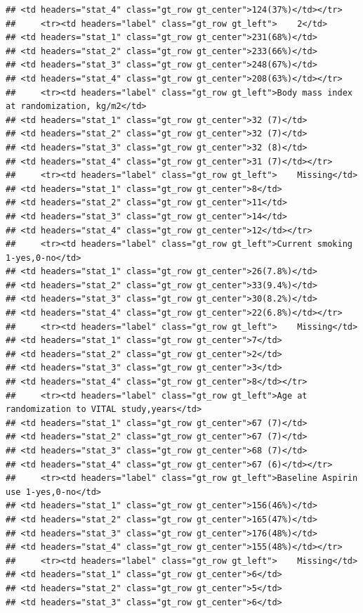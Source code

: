 \documentclass{article}
\begin{document}
\begin{verbatim}
## <td headers="stat_4" class="gt_row gt_center">124(37%)</td></tr>
##     <tr><td headers="label" class="gt_row gt_left">    2</td>
## <td headers="stat_1" class="gt_row gt_center">231(68%)</td>
## <td headers="stat_2" class="gt_row gt_center">233(66%)</td>
## <td headers="stat_3" class="gt_row gt_center">248(67%)</td>
## <td headers="stat_4" class="gt_row gt_center">208(63%)</td></tr>
##     <tr><td headers="label" class="gt_row gt_left">Body mass index at randomization, kg/m2</td>
## <td headers="stat_1" class="gt_row gt_center">32 (7)</td>
## <td headers="stat_2" class="gt_row gt_center">32 (7)</td>
## <td headers="stat_3" class="gt_row gt_center">32 (8)</td>
## <td headers="stat_4" class="gt_row gt_center">31 (7)</td></tr>
##     <tr><td headers="label" class="gt_row gt_left">    Missing</td>
## <td headers="stat_1" class="gt_row gt_center">8</td>
## <td headers="stat_2" class="gt_row gt_center">11</td>
## <td headers="stat_3" class="gt_row gt_center">14</td>
## <td headers="stat_4" class="gt_row gt_center">12</td></tr>
##     <tr><td headers="label" class="gt_row gt_left">Current smoking 1-yes,0-no</td>
## <td headers="stat_1" class="gt_row gt_center">26(7.8%)</td>
## <td headers="stat_2" class="gt_row gt_center">33(9.4%)</td>
## <td headers="stat_3" class="gt_row gt_center">30(8.2%)</td>
## <td headers="stat_4" class="gt_row gt_center">22(6.8%)</td></tr>
##     <tr><td headers="label" class="gt_row gt_left">    Missing</td>
## <td headers="stat_1" class="gt_row gt_center">7</td>
## <td headers="stat_2" class="gt_row gt_center">2</td>
## <td headers="stat_3" class="gt_row gt_center">3</td>
## <td headers="stat_4" class="gt_row gt_center">8</td></tr>
##     <tr><td headers="label" class="gt_row gt_left">Age at randomization to VITAL study,years</td>
## <td headers="stat_1" class="gt_row gt_center">67 (7)</td>
## <td headers="stat_2" class="gt_row gt_center">67 (7)</td>
## <td headers="stat_3" class="gt_row gt_center">68 (7)</td>
## <td headers="stat_4" class="gt_row gt_center">67 (6)</td></tr>
##     <tr><td headers="label" class="gt_row gt_left">Baseline Aspirin use 1-yes,0-no</td>
## <td headers="stat_1" class="gt_row gt_center">156(46%)</td>
## <td headers="stat_2" class="gt_row gt_center">165(47%)</td>
## <td headers="stat_3" class="gt_row gt_center">176(48%)</td>
## <td headers="stat_4" class="gt_row gt_center">155(48%)</td></tr>
##     <tr><td headers="label" class="gt_row gt_left">    Missing</td>
## <td headers="stat_1" class="gt_row gt_center">6</td>
## <td headers="stat_2" class="gt_row gt_center">5</td>
## <td headers="stat_3" class="gt_row gt_center">6</td>

\end{verbatim}
\end{document}
